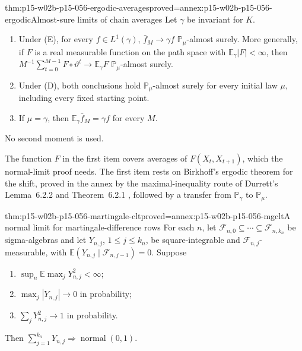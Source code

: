 \begin{hbtheorem}{thm:p15-w02b-p15-056-ergodic-averages}{proved=annex:p15-w02b-p15-056-ergodic}{Almost-sure limits of chain averages}
Let \(\gamma\) be invariant for \(K\).
\begin{enumerate}
\item Under (E), for every \(f\in L^1(\gamma)\),
\(\bar f_M\to\gamma f\) \(\mathbb P_\mu\)-almost surely. More generally,
if \(F\) is a real measurable function on the path space with
\(\mathbb E_\gamma|F|<\infty\), then
\(M^{-1}\sum_{t=0}^{M-1}F\circ\vartheta^t\to\mathbb E_\gamma F\)
\(\mathbb P_\mu\)-almost surely.
\item Under (D), both conclusions hold \(\mathbb P_\mu\)-almost surely for
every initial law \(\mu\), including every fixed starting point.
\item If \(\mu=\gamma\), then \(\mathbb E_\gamma\bar f_M=\gamma f\) for
every \(M\).
\end{enumerate}
No second moment is used.
\end{hbtheorem}

The function \(F\) in the first item covers averages of
\(F(X_t,X_{t+1})\), which the normal-limit proof needs. The first item
rests on Birkhoff's ergodic theorem for the shift, proved in the annex by
the maximal-inequality route of Durrett's Lemma~6.2.2 and
Theorem~6.2.1 \cite[Sec.~6.2, pp.~335--336]{DurrettPTEAuthor2019},
followed by a transfer from \(\mathbb P_\gamma\) to \(\mathbb P_\mu\).

\begin{hblemma}{thm:p15-w02b-p15-056-martingale-clt}{proved=annex:p15-w02b-p15-056-mgclt}{A normal limit for martingale-difference rows}
For each \(n\), let
\(\mathcal F_{n,0}\subseteq\cdots\subseteq\mathcal F_{n,k_n}\) be
sigma-algebras and let \(Y_{n,j}\), \(1\leq j\leq k_n\), be
square-integrable and \(\mathcal F_{n,j}\)-measurable, with
\(\mathbb E(Y_{n,j}\mid\mathcal F_{n,j-1})=0\). Suppose
\begin{enumerate}
\item \(\sup_n\mathbb E\max_jY_{n,j}^2<\infty\);
\item \(\max_j|Y_{n,j}|\to0\) in probability;
\item \(\sum_jY_{n,j}^2\to1\) in probability.
\end{enumerate}
Then \(\sum_{j=1}^{k_n}Y_{n,j}\Rightarrow\operatorname{normal}(0,1)\).
\end{hblemma}

